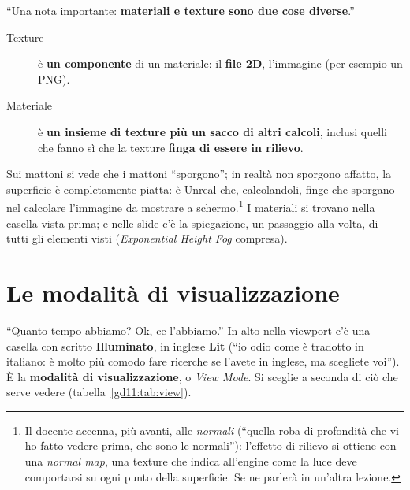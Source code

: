 ``Una nota importante: \textbf{materiali e texture sono due cose diverse}.''
\begin{description}
  \item[Texture] è \textbf{un componente} di un materiale: il \textbf{file 2D},
        l'immagine (per esempio un PNG).
  \item[Materiale] è \textbf{un insieme di texture più un sacco di altri
        calcoli}, inclusi quelli che fanno sì che la texture \textbf{finga di
        essere in rilievo}.
\end{description}
Sui mattoni si vede che i mattoni ``sporgono''; in realtà non sporgono affatto,
la superficie è completamente piatta: è Unreal che, calcolandoli, finge che
sporgano nel calcolare l'immagine da mostrare a schermo.\footnote{Il docente
accenna, più avanti, alle \emph{normali} (``quella roba di profondità che vi ho
fatto vedere prima, che sono le normali''): l'effetto di rilievo si ottiene con
una \emph{normal map}, una texture che indica all'engine come la luce deve
comportarsi su ogni punto della superficie. Se ne parlerà in un'altra
lezione.} I materiali si trovano nella casella vista prima; e nelle slide c'è la
spiegazione, un passaggio alla volta, di tutti gli elementi visti
(\emph{Exponential Height Fog} compresa).

\section{Le modalità di visualizzazione}
\label{gd11:sec:viewmode}

``Quanto tempo abbiamo? Ok, ce l'abbiamo.'' In alto nella viewport c'è una
casella con scritto \textbf{Illuminato}, in inglese \textbf{Lit} (``io odio come
è tradotto in italiano: è molto più comodo fare ricerche se l'avete in inglese,
ma scegliete voi''). È la \textbf{modalità di visualizzazione}, o \emph{View
Mode}. Si sceglie a seconda di ciò che serve vedere (tabella~\ref{gd11:tab:view}).

